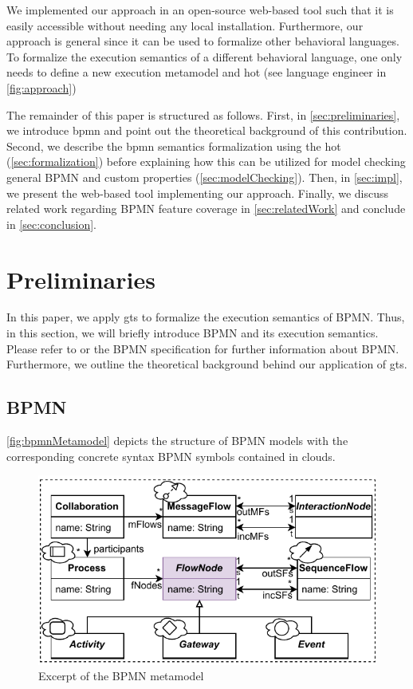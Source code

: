 \documentclass[runningheads]{llncs}
\begin{document}
We implemented our approach in an open-source web-based tool such that it is easily accessible without needing any local installation.
Furthermore, our approach is general since it can be used to formalize other behavioral languages.
To formalize the execution semantics of a different behavioral language, one only needs to define a new execution metamodel and \gls*{hot} (see language engineer in \autoref{fig:approach})

The remainder of this paper is structured as follows.
First, in \autoref{sec:preliminaries}, we introduce \gls*{bpmn} and point out the theoretical background of this contribution.
Second, we describe the \gls*{bpmn} semantics formalization using the \gls*{hot} (\autoref{sec:formalization}) before explaining how this can be utilized for model checking general BPMN and custom properties (\autoref{sec:modelChecking}).
Then, in \autoref{sec:impl}, we present the web-based tool implementing our approach.
Finally, we discuss related work regarding BPMN feature coverage in \autoref{sec:relatedWork} and conclude in \autoref{sec:conclusion}.

\section{Preliminaries} \label{sec:preliminaries}
In this paper, we apply \gls*{gt}s to formalize the execution semantics of BPMN.
Thus, in this section, we will briefly introduce BPMN and its execution semantics.
Please refer to \cite{freundRealLifeBPMNUsing2019} or the BPMN specification \cite{objectmanagementgroupBusinessProcessModel2013} for further information about BPMN.
Furthermore, we outline the theoretical background behind our application of \gls*{gt}s.
\subsection{BPMN}
\autoref{fig:bpmnMetamodel} depicts the structure of BPMN models with the corresponding concrete syntax BPMN symbols contained in clouds.

\begin{figure}[ht]
  \centering
  \includegraphics[width=0.7\linewidth]{images/bpmn_semantics-bpmn-metamodel.pdf}
  \caption{Excerpt of the BPMN metamodel \cite{objectmanagementgroupBusinessProcessModel2013}}
  \label{fig:bpmnMetamodel}
\end{figure}
\end{document}
